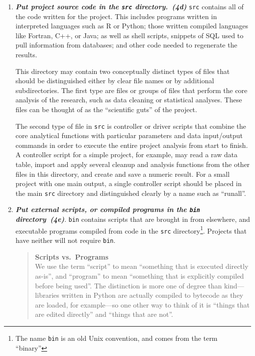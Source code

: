 \documentclass[10pt,letterpaper]{article}
\newcommand{\practice}[2]{\textbf{\emph{{#2}~({#1})}}}
\begin{document}
\begin{enumerate}
\item
  \practice{4d}{Put project source code in the \texttt{src} directory.}
  \texttt{src} contains all of the code written for the project. This includes
  programs written in interpreted languages
  such as R or Python; those written compiled languages like
  Fortran, C++, or Java; as well as shell scripts, snippets of SQL used to pull
  information from databases; and other code needed to regenerate
  the results.

    This directory may contain two conceptually distinct types
    of files that should be distinguished either by clear file names or by
    additional subdirectories. The first type are files or
    groups of files that perform the core
    analysis of the research, such as data cleaning or statistical analyses.
    These files can be thought of as the
    ``scientific guts'' of the project.

    The second type of file in \texttt{src} is controller or driver
    scripts that combine the core analytical functions with particular
    parameters and data input/output commands in order to execute the
    entire project analysis from start to finish. A controller script for
    a simple project, for example, may read a raw data table, import and
    apply several cleanup and analysis functions from the other files in
    this directory, and create and save a numeric result. For a small
    project with one main output, a single controller script should be
    placed in the main \texttt{src} directory and distinguished clearly by
    a name such as ``runall''.

\item
  \practice{4e}{Put external scripts, or compiled programs
   in the \texttt{bin} directory}.  \texttt{bin} contains
  scripts that are brought in from elsewhere, and executable programs
  compiled from code in the \texttt{src} directory\footnote{The name
    \texttt{bin} is an old Unix convention, and comes from the term
    ``binary''}. Projects that have neither will not require \texttt{bin}.

  \begin{quote}
    \noindent \textbf{Scripts vs.\ Programs}
    \\
    We use the term ``script'' to mean ``something that is executed
    directly as-is'', and ``program'' to mean ``something that is
    explicitly compiled before being used''.  The distinction is more
    one of degree than kind---libraries written in Python are actually
    compiled to bytecode as they are loaded, for example---so one
    other way to think of it is ``things that are edited directly''
    and ``things that are not''.
  \end{quote}


\end{enumerate}
\end{document}
